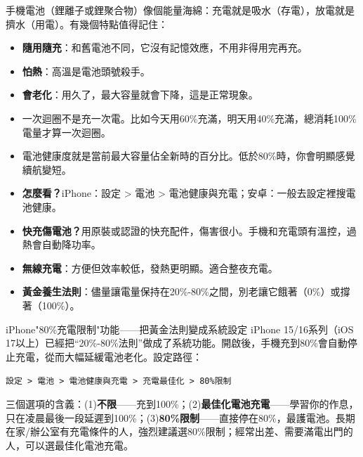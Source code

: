 


手機電池（鋰離子或鋰聚合物）像個能量海綿：充電就是吸水（存電），放電就是擠水（用電）。有幾個特點值得記住：

\begin{itemize}
  \item \textbf{隨用隨充}：和舊電池不同，它沒有記憶效應，不用非得用完再充。
  \item \textbf{怕熱}：高溫是電池頭號殺手。
  \item \textbf{會老化}：用久了，最大容量就會下降，這是正常現象。
\end{itemize}


\begin{itemize}
  \item 一次迴圈不是充一次電。比如今天用60\%充滿，明天用40\%充滿，總消耗100\%電量才算一次迴圈。
  \item 電池健康度就是當前最大容量佔全新時的百分比。低於80\%時，你會明顯感覺續航變短。
  \item \textbf{怎麼看？}iPhone：設定 > 電池 > 電池健康與充電；安卓：一般去設定裡搜電池健康。
\end{itemize}


\begin{itemize}
  \item \textbf{快充傷電池？}用原裝或認證的快充配件，傷害很小。手機和充電頭有溫控，過熱會自動降功率。
  \item \textbf{無線充電}：方便但效率較低，發熱更明顯。適合整夜充電。
  \item \textbf{黃金養生法則}：儘量讓電量保持在20\%-80\%之間，別老讓它餓著（0\%）或撐著（100\%）。
\end{itemize}

\begin{tcbinfo}{iPhone"80\%充電限制"功能——把黃金法則變成系統設定}
iPhone 15/16系列（iOS 17以上）已經把“20\%-80\%法則”做成了系統功能。開啟後，手機充到80\%會自動停止充電，從而大幅延緩電池老化。設定路徑：

\texttt{設定 > 電池 > 電池健康與充電 > 充電最佳化 > 80\%限制}

三個選項的含義：(1)\textbf{不限}——充到100\%；(2)\textbf{最佳化電池充電}——學習你的作息，只在凌晨最後一段延遲到100\%；(3)\textbf{80\%限制}——直接停在80\%，最護電池。長期在家/辦公室有充電條件的人，強烈建議選80\%限制；經常出差、需要滿電出門的人，可以選最佳化電池充電。

\end{tcbinfo}

